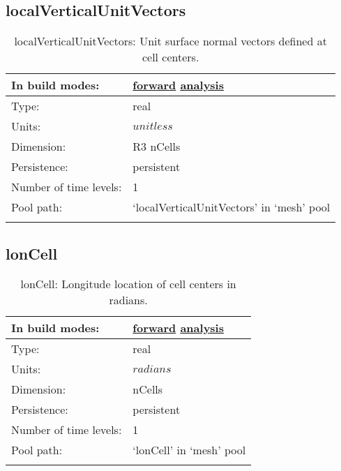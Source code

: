 \subsection[localVerticalUnitVectors]{localVerticalUnitVectors}
\label{subsec:var_sec_mesh_localVerticalUnitVectors}
\begin{center}
\begin{longtable}{| p{2.0in} | p{4.0in} |}
        \hline 
        In build modes: & \hyperref[subsec:forward_var_tab_mesh]{forward} \hyperref[subsec:analysis_var_tab_mesh]{analysis} \\
        \hline 
        Type: & real \\
        \hline 
        Units: & $unitless$ \\
        \hline 
        Dimension: & R3 nCells \\
        \hline 
        Persistence: & persistent \\
        \hline 
        Number of time levels: & 1 \\
        \hline 
            Pool path: & `localVerticalUnitVectors' in `mesh' pool \\
		 \hline 
    \caption{localVerticalUnitVectors: Unit surface normal vectors defined at cell centers.}
\end{longtable}
\end{center}
\subsection[lonCell]{lonCell}
\label{subsec:var_sec_mesh_lonCell}
\begin{center}
\begin{longtable}{| p{2.0in} | p{4.0in} |}
        \hline 
        In build modes: & \hyperref[subsec:forward_var_tab_mesh]{forward} \hyperref[subsec:analysis_var_tab_mesh]{analysis} \\
        \hline 
        Type: & real \\
        \hline 
        Units: & $radians$ \\
        \hline 
        Dimension: & nCells \\
        \hline 
        Persistence: & persistent \\
        \hline 
        Number of time levels: & 1 \\
        \hline 
            Pool path: & `lonCell' in `mesh' pool \\
		 \hline 
    \caption{lonCell: Longitude location of cell centers in radians.}
\end{longtable}
\end{center}
